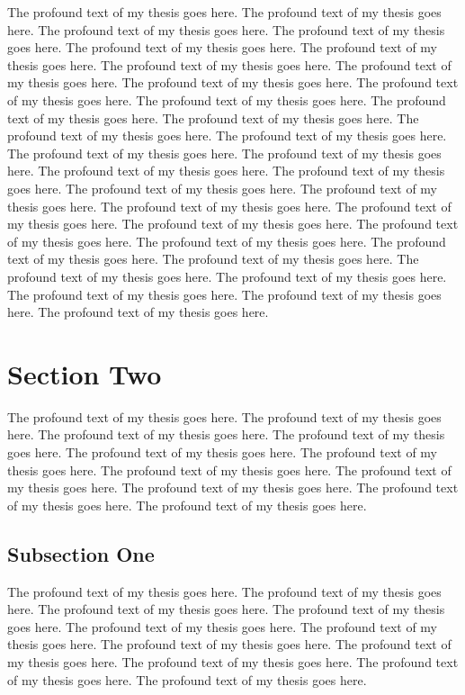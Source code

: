The profound text of my thesis goes here. The profound text of my thesis
goes here. The profound text of my thesis goes here. The profound text of my
thesis goes here. The profound text of my thesis goes here. The profound
text of my thesis goes here. The profound text of my thesis goes here. The
profound text of my thesis goes here. The profound text of my thesis goes
here. The profound text of my thesis goes here. The profound text of my
thesis goes here. The profound text of my thesis goes here. The profound
text of my thesis goes here. The profound text of my thesis goes here. The
profound text of my thesis goes here. The profound text of my thesis goes
here. The profound text of my thesis goes here. The profound text of my
thesis goes here. The profound text of my thesis goes here. The profound
text of my thesis goes here. The profound text of my thesis goes here. The
profound text of my thesis goes here. The profound text of my thesis goes
here. The profound text of my thesis goes here. The profound text of my
thesis goes here. The profound text of my thesis goes here. The profound
text of my thesis goes here. The profound text of my thesis goes here. The
profound text of my thesis goes here. The profound text of my thesis goes
here. The profound text of my thesis goes here. The profound text of my
thesis goes here. The profound text of my thesis goes here.

\section{Section Two}

The profound text of my thesis goes here. The profound text of my thesis
goes here. The profound text of my thesis goes here. The profound text of my
thesis goes here. The profound text of my thesis goes here. The profound
text of my thesis goes here. The profound text of my thesis goes here. The
profound text of my thesis goes here. The profound text of my thesis goes
here. The profound text of my thesis goes here. The profound text of my
thesis goes here.

\subsection{Subsection One}

The profound text of my thesis goes here. The profound text of my thesis
goes here. The profound text of my thesis goes here. The profound text of my
thesis goes here. The profound text of my thesis goes here. The profound
text of my thesis goes here. The profound text of my thesis goes here. The
profound text of my thesis goes here. The profound text of my thesis goes
here. The profound text of my thesis goes here. The profound text of my
thesis goes here.

